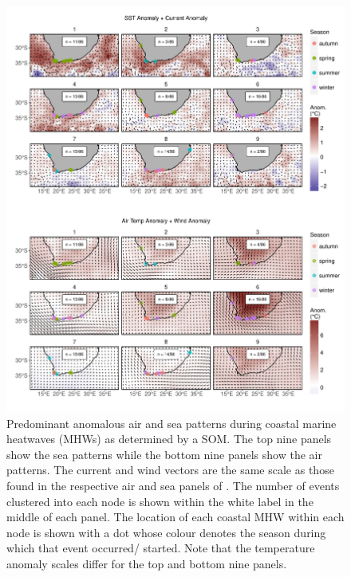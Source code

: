 \documentclass[a4paper,10pt,review]{elsarticle}
\begin{document}
\begin{figure}
\includegraphics[width=1.0\textwidth]{figure_4.pdf}
\caption{Predominant anomalous air and sea patterns during coastal marine heatwaves (MHWs) as determined by a SOM. The top nine panels show the sea patterns while the bottom nine panels show the air patterns. The current and wind vectors are the same scale as those found in the respective air and sea panels of . The number of events clustered into each node is shown within the white label in the middle of each panel. The location of each coastal MHW within each node is shown with a dot whose colour denotes the season during which that event occurred/ started. Note that the temperature anomaly scales differ for the top and bottom nine panels.}
\label{figure4}
\end{figure}
\end{document}

